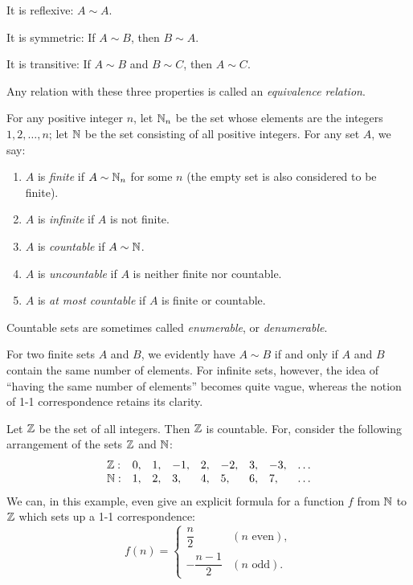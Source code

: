 It is reflexive: $A \sim A$.

It is symmetric: If $A \sim B$, then $B \sim A$.

It is transitive: If $A \sim B$ and $B \sim C$, then $A \sim C$.

Any relation with these three properties is called an \emph{equivalence
relation}.

For any positive integer $n$, let $\mathbb{N}_n$ be the set whose elements are the
integers $1,2,\dots,n$; let $\mathbb{N}$ be the set consisting of all positive
integers. For any set $A$, we say:
\begin{enumerate}[label=(\alph*), leftmargin=2.2em, itemsep=1pt, topsep=3pt]
  \item $A$ is \emph{finite} if $A \sim \mathbb{N}_n$ for some $n$ (the empty set is
        also considered to be finite).
  \item $A$ is \emph{infinite} if $A$ is not finite.
  \item $A$ is \emph{countable} if $A \sim \mathbb{N}$.
  \item $A$ is \emph{uncountable} if $A$ is neither finite nor countable.
  \item $A$ is \emph{at most countable} if $A$ is finite or countable.
\end{enumerate}
Countable sets are sometimes called \emph{enumerable}, or
\emph{denumerable}.

For two finite sets $A$ and $B$, we evidently have $A \sim B$ if and only if
$A$ and $B$ contain the same number of elements. For infinite sets, however,
the idea of ``having the same number of elements'' becomes quite vague, whereas
the notion of 1-1 correspondence retains its clarity.

Let $\mathbb{Z}$ be the set of all integers. Then $\mathbb{Z}$ is countable. For, consider the
following arrangement of the sets $\mathbb{Z}$ and $\mathbb{N}$:
\[
\begin{array}{lllllllll}
  \mathbb{Z}: & 0, & 1, & -1, & 2, & -2, & 3, & -3, & \dots\\
  \mathbb{N}: & 1, & 2, & 3,  & 4, & 5,  & 6, & 7,  & \dots
\end{array}
\]
We can, in this example, even give an explicit formula for a function $f$ from
$\mathbb{N}$ to $\mathbb{Z}$ which sets up a 1-1 correspondence:
\[
  f(n) = \begin{cases}
    \dfrac{n}{2} & (n \text{ even}),\\[6pt]
    -\dfrac{n-1}{2} & (n \text{ odd}).
  \end{cases}
\]

